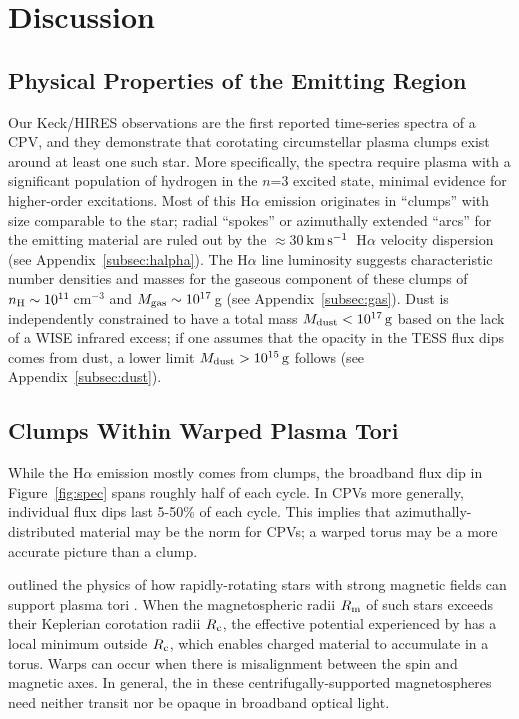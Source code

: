 \documentclass[11pt,twocolumn,tighten,linenumbers]{aastex7}
\newcommand{\kms}{\ensuremath{\rm km\,s^{-1}}}
\begin{document}
\section{Discussion}
\label{sec:disc}

\subsection{Physical Properties of the Emitting Region}


Our Keck/HIRES observations are the first reported time-series spectra
of a CPV, and they demonstrate that corotating circumstellar plasma
clumps exist around at least one such star.  More specifically, the
spectra require plasma with a significant population of hydrogen in
the $n$=3 excited state, minimal evidence for
higher-order excitations.  Most of this H$\alpha$ emission originates
in ``clumps'' with size comparable to the star; radial ``spokes'' or
azimuthally extended ``arcs'' for the emitting material are ruled out
by the $\approx$30\,\kms\ H$\alpha$ velocity dispersion (see
Appendix~\ref{subsec:halpha}).  The H$\alpha$ line luminosity suggests
characteristic number densities and masses for the gaseous component
of these clumps of $n_{\rm H} \sim 10^{11}$\,cm$^{-3}$ and $M_{\rm
gas} \sim 10^{17}$\,g (see Appendix~\ref{subsec:gas}).  Dust is
independently constrained to have a total mass $M_{\rm dust} <
10^{17}\,{\rm g}$ based on the lack of a WISE infrared excess; if one
assumes that the opacity in the TESS flux dips comes from dust, a
lower limit $M_{\rm dust} > 10^{15}\,{\rm g}$ follows (see
Appendix~\ref{subsec:dust}).  


\subsection{Clumps Within Warped Plasma Tori}

While the H$\alpha$ emission mostly comes from clumps, the broadband
flux dip in Figure~\ref{fig:spec} spans roughly half of each cycle.
In CPVs more generally, individual flux dips last 5-50\% of each
cycle\citep{Bouma2024}.  This implies that azimuthally-distributed
material may be the norm for CPVs; a warped torus may be a more
accurate picture than a clump.

\citet{Townsend2005} outlined the physics of how rapidly-rotating
stars with strong magnetic fields can support plasma tori
.  When
the magnetospheric radii $R_{\rm m}$ of such stars exceeds their
Keplerian corotation radii $R_{\rm c}$, the effective potential experienced by has a local minimum outside $R_{\rm c}$, which
enables charged material to accumulate in a torus.  Warps can occur
when there is misalignment between the spin and magnetic axes.  In
general, the in these centrifugally-supported
magnetospheres need
neither transit nor be opaque in broadband optical light.  
\end{document}
